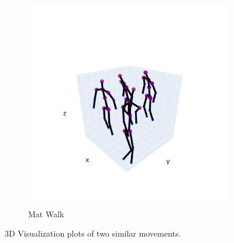 \begin{figure}[h]
\begin{subfigure}{.5\textwidth}
                  \includegraphics[width=1.\linewidth]{../src/resources/plots/movements/mov-8.png}
                  \caption{Mat Walk}
                  \label{fig: mat-walk}
                \end{subfigure}
                \caption{3D Visualization plots of two similar movements.}
            \end{figure}

\cleardoublepage